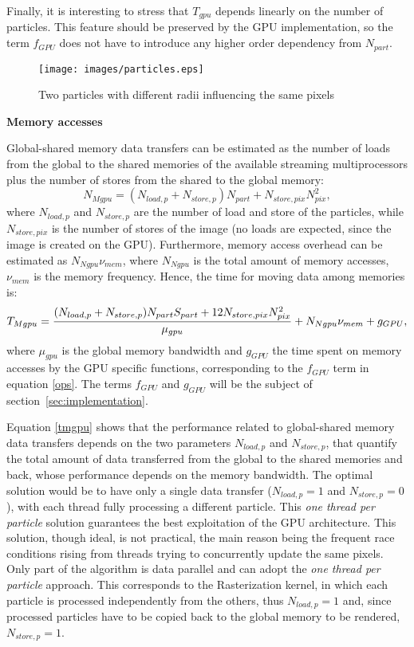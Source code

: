 \documentclass[11pt]{article}
\begin{document}
Finally, it is interesting to stress that $T_{gpu}$ depends linearly on the number of particles. 
This feature should be preserved by the GPU implementation, so the term 
$f_{GPU}$ does not have to introduce any higher order dependency from $N_{part}$. 

\begin{figure}
\centering
\texttt{[image: images/particles.eps]}
\caption{Two particles with different radii influencing the same pixels}
\label{fig:particles}
\end{figure}


\medskip
\noindent
{\bf Memory accesses}

Global-shared memory data transfers can be estimated 
as the number of loads from the global to the shared memories of the available 
streaming multiprocessors plus the number of stores from the shared to the global memory: 
\begin{equation}
N_{Mgpu} = (N_{load,p} + N_{store,p}) N_{part} + N_{store,pix} N_{pix}^2,
\end{equation}
where $N_{load,p}$ and $N_{store,p}$ are the number of load and store of the 
particles, while $N_{store,pix}$ is the number of stores of the image (no loads 
are expected, since the image is created on the GPU). 
Furthermore, memory access overhead can be estimated as $N_{Ngpu} \nu_{mem}$,
where $N_{Ngpu}$ is the total amount of memory accesses, $\nu_{mem}$
is the memory frequency. 
Hence, the time for moving data among memories is:
\begin{equation}\label{tmgpu}
T_{Mgpu} = {(N_{load,p} + N_{store,p}) N_{part} S_{part}
+ 12 N_{store,pix} N_{pix}^2\over \mu_{gpu}}
+ N_{Ngpu} \nu_{mem} + g_{GPU},
\end{equation}
where $\mu_{gpu}$ is the global memory bandwidth
and $g_{GPU}$ the time 
spent on memory accesses by the GPU specific
functions, corresponding to the $f_{GPU}$ term in equation \eqref{ops}.
The terms $f_{GPU}$ and $g_{GPU}$ will be the subject of section~\ref{sec:implementation}.

Equation \eqref{tmgpu} shows that the performance related to global-shared memory 
data transfers
depends on the two parameters $N_{load,p}$ and $N_{store,p}$, that quantify the
total amount of data transferred from the global to the shared memories 
and back, whose performance depends on the memory bandwidth.
The optimal solution would be to have only a single data transfer
($N_{load,p} = 1$ and $N_{store,p} = 0$), with each thread
fully processing a different particle. This {\it one thread per particle} solution guarantees
the best exploitation of the GPU architecture.
This solution, though ideal, is not practical, the main reason being the frequent race conditions
rising from threads trying to concurrently update the same pixels.
Only part of the algorithm is data parallel and can adopt the {\it one thread per particle}
approach. This corresponds to the Rasterization kernel, in which each particle
is processed independently from the others, thus
$N_{load,p} = 1$ and, since processed particles
have to be copied back to the global memory to be rendered, $N_{store,p} = 1$.
\end{document}
